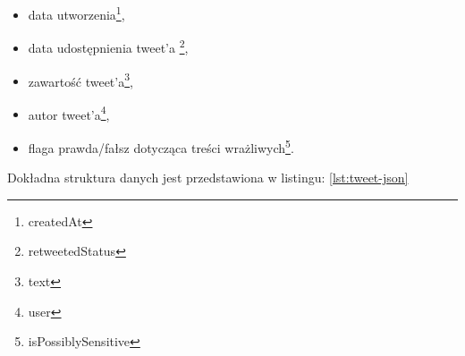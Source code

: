\begin{itemize}\label{items:tweet-fields}
	\item data utworzenia\footnote{createdAt},
	\item data udostępnienia tweet'a \footnote{retweetedStatus},
	\item zawartość tweet'a\footnote{text},
	\item autor tweet'a\footnote{user},
	\item flaga prawda/fałsz dotycząca treści wrażliwych\footnote{isPossiblySensitive}.
\end{itemize}
Dokładna struktura danych jest przedstawiona w listingu: \ref{lst:tweet-json}
  

